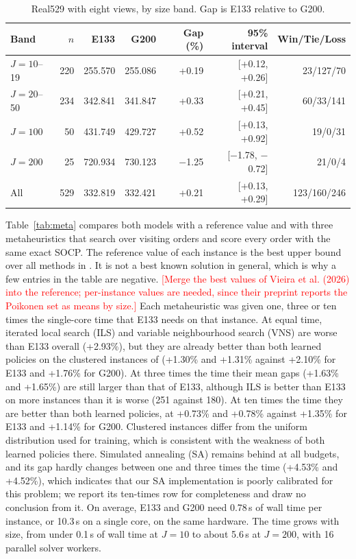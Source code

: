 \documentclass[preprint,12pt,authoryear]{elsarticle}
\newcommand{\placeholder}[1]{\textcolor{red}{[#1]}}
\DeclareRobustCommand{\zhcap}[1]{{\color{zhc}#1}}
\begin{document}
\begin{table}[!htbp]
\centering
\caption{Real529 with eight views, by size band. Gap is E133 relative to G200.\protect\newline\zhcap{八视角下按规模段的 Real529。差距为 E133 相对 G200。}}
\label{tab:real}
\small
\begin{tabular}{lrrrrrr}
\toprule
Band & $n$ & E133 & G200 & Gap (\%) & 95\% interval & Win/Tie/Loss \\
\midrule
$J = 10$--19 & 220 & 255.570 & 255.086 & +0.19 & [+0.12, +0.26] & 23/127/70 \\
$J = 20$--50 & 234 & 342.841 & 341.847 & +0.33 & [+0.21, +0.45] & 60/33/141 \\
$J = 100$ & 50 & 431.749 & 429.727 & +0.52 & [+0.13, +0.92] & 19/0/31 \\
$J = 200$ & 25 & 720.934 & 730.123 & $-$1.25 & [$-$1.78, $-$0.72] & 21/0/4 \\
All & 529 & 332.819 & 332.421 & +0.21 & [+0.13, +0.29] & 123/160/246 \\
\bottomrule
\end{tabular}
\end{table}

Table~\ref{tab:meta} compares both models with a reference value and with three metaheuristics that search over visiting orders and score every order with the same exact SOCP. The reference value of each instance is the best upper bound over all methods in \citet{li2025}. It is not a best known solution in general, which is why a few entries in the table are negative. \placeholder{Merge the best values of Vieira et al. (2026) into the reference; per-instance values are needed, since their preprint reports the Poikonen set as means by size.} Each metaheuristic was given one, three or ten times the single-core time that E133 needs on that instance. At equal time, iterated local search (ILS) and variable neighbourhood search (VNS) are worse than E133 overall (+2.93\%), but they are already better than both learned policies on the clustered instances of \citet{poikonen2020} (+1.30\% and +1.31\% against +2.10\% for E133 and +1.76\% for G200). At three times the time their mean gaps (+1.63\% and +1.65\%) are still larger than that of E133, although ILS is better than E133 on more instances than it is worse (251 against 180). At ten times the time they are better than both learned policies, at +0.73\% and +0.78\% against +1.35\% for E133 and +1.14\% for G200. Clustered instances differ from the uniform distribution used for training, which is consistent with the weakness of both learned policies there. Simulated annealing (SA) remains behind at all budgets, and its gap hardly changes between one and three times the time (+4.53\% and +4.52\%), which indicates that our SA implementation is poorly calibrated for this problem; we report its ten-times row for completeness and draw no conclusion from it. On average, E133 and G200 need 0.78\,s of wall time per instance, or 10.3\,s on a single core, on the same hardware. The time grows with size, from under 0.1\,s of wall time at $J = 10$ to about 5.6\,s at $J = 200$, with 16 parallel solver workers.
\end{document}
